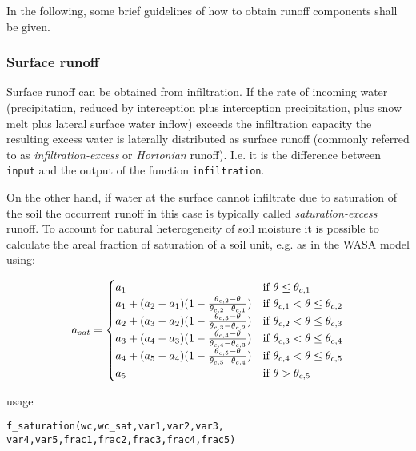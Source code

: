 In the following, some brief guidelines of how to obtain runoff components shall be given.


\subsubsection{Surface runoff}
Surface runoff can be obtained from infiltration. If the rate of incoming water (precipitation, reduced by interception plus interception precipitation, plus snow melt plus lateral surface water inflow) exceeds the infiltration capacity the resulting excess water is laterally distributed as surface runoff (commonly referred to as \emph{infiltration-excess} or \emph{Hortonian} runoff). I.e. it is the difference between \verb!input! and the output of the function \verb!infiltration!.

On the other hand, if water at the surface cannot infiltrate due to saturation of the soil the occurrent runoff in this case is typically called \emph{saturation-excess} runoff. To account for natural heterogeneity of soil moisture it is possible to calculate the areal fraction of saturation of a soil unit, e.g. as in the WASA model \citep{Guentner2002} using:

\begin{equation}\label{eq:f_sat}
a_{sat} = 
\begin{cases}
a_1 & \mbox{if } \theta \leq \theta_{c,1} \\
a_1 + (a_2 - a_1) (1 - \frac{\theta_{c,2} - \theta}{\theta_{c,2} - \theta_{c,1}}) & \mbox{if } \theta_{c,1} < \theta \leq \theta_{c,2}\\
a_2 + (a_3 - a_2) (1 - \frac{\theta_{c,3} - \theta}{\theta_{c,3} - \theta_{c,2}}) & \mbox{if } \theta_{c,2} < \theta \leq \theta_{c,3}\\
a_3 + (a_4 - a_3) (1 - \frac{\theta_{c,4} - \theta}{\theta_{c,4} - \theta_{c,3}}) & \mbox{if } \theta_{c,3} < \theta \leq \theta_{c,4}\\
a_4 + (a_5 - a_4) (1 - \frac{\theta_{c,5} - \theta}{\theta_{c,5} - \theta_{c,4}}) & \mbox{if } \theta_{c,4} < \theta \leq \theta_{c,5}\\
a_5 & \mbox{if } \theta > \theta_{c,5} \\
\end{cases}
\end{equation}

\noindent
usage
\begin{verbatim}
f_saturation(wc,wc_sat,var1,var2,var3,
var4,var5,frac1,frac2,frac3,frac4,frac5)
\end{verbatim}

